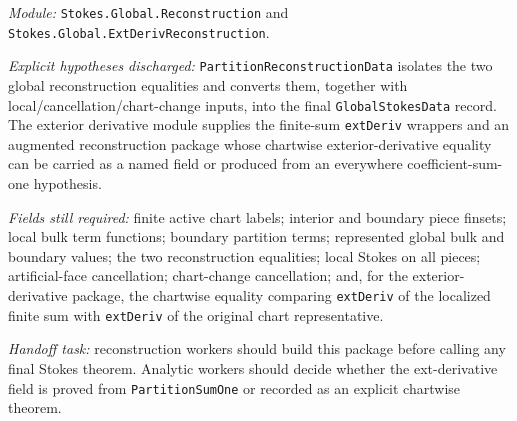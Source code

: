 \begin{definition}
  \label{anc:m6_reconstruction_constructors}
  \leanok
  \emph{Module:} \texttt{Stokes.Global.Reconstruction} and
  \texttt{Stokes.Global.ExtDerivReconstruction}.

  \emph{Explicit hypotheses discharged:}
  \texttt{PartitionReconstructionData} isolates the two global reconstruction
  equalities and converts them, together with local/cancellation/chart-change
  inputs, into the final \texttt{GlobalStokesData} record.  The exterior
  derivative module supplies the finite-sum \texttt{extDeriv} wrappers and an
  augmented reconstruction package whose chartwise exterior-derivative
  equality can be carried as a named field or produced from an everywhere
  coefficient-sum-one hypothesis.

  \emph{Fields still required:}
  finite active chart labels; interior and boundary piece finsets; local bulk
  term functions; boundary partition terms; represented global bulk and
  boundary values; the two reconstruction equalities; local Stokes on all
  pieces; artificial-face cancellation; chart-change cancellation; and, for
  the exterior-derivative package, the chartwise equality comparing
  \texttt{extDeriv} of the localized finite sum with \texttt{extDeriv} of the
  original chart representative.

  \emph{Handoff task:}
  reconstruction workers should build this package before calling any final
  Stokes theorem.  Analytic workers should decide whether the ext-derivative
  field is proved from \texttt{PartitionSumOne} or recorded as an explicit
  chartwise theorem.
\end{definition}

